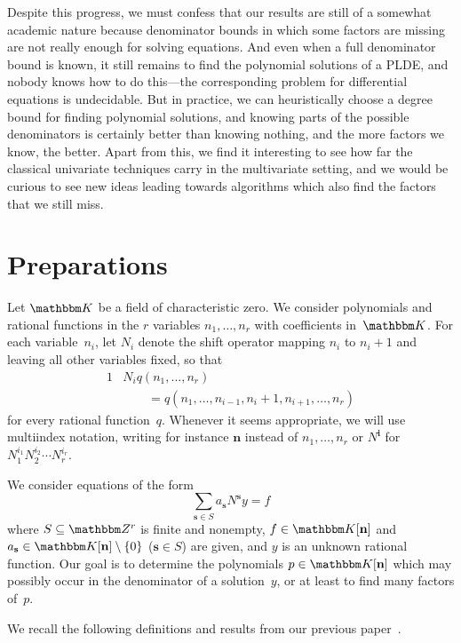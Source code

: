 \documentclass[a4paper]{sig-alternate}
\let\set\mathbbm
\def\vec#1{\mathbf{#1}}
\def\K{\set K}
\begin{document}
Despite this progress, we must confess that our results are still of a somewhat
academic nature because denominator bounds in which some factors are missing are
not really enough for solving equations. And even when a full denominator bound
is known, it still remains to find the polynomial solutions of a PLDE, and
nobody knows how to do this---the corresponding problem for differential
equations is undecidable. But in practice, we can heuristically choose a degree
bound for finding polynomial solutions, and knowing parts of the possible
denominators is certainly better than knowing nothing, and the more factors we
know, the better. Apart from this, we find it interesting to see how far the
classical univariate techniques carry in the multivariate setting, and we would
be curious to see new ideas leading towards algorithms which also find the
factors that we still miss.

\section{Preparations}

Let $\K$ be a field of characteristic zero. We consider polynomials and rational functions
in the $r$ variables $n_1,\dots,n_r$ with coefficients in~$\K$. For each variable~$n_i$,
let $N_i$ denote the shift operator mapping $n_i$ to $n_i+1$ and leaving all other variables
fixed, so that
\begin{alignat*}1
  &N_i q(n_1,\dots,n_r)\\
  &\qquad=q(n_1,\dots,n_{i-1},n_i+1,n_{i+1},\dots,n_r)
\end{alignat*}
for every rational function~$q$. Whenever it seems appropriate, we will use multiindex
notation, writing for instance $\vec n$ instead of $n_1,\dots,n_r$ or $N^{\vec i}$
for $N_1^{i_1}N_2^{i_2}\cdots N_r^{i_r}$.

We consider equations of the form
\begin{equation}\label{eq:main}
  \sum_{\vec s\in S}a_{\vec s}N^{\vec s}y=f
\end{equation}
where $S\subseteq\set Z^r$ is finite and nonempty, $f\in\K[\vec n]$ and $a_{\vec s}\in\K[\vec n]\setminus\{0\}$
($\vec s\in S$) are given, and $y$ is an unknown rational function.
Our goal is to determine the polynomials $p\in\K[\vec n]$ which may possibly occur in the denominator
of a solution~$y$, or at least to find many factors of~$p$.

We recall the following definitions and results from our previous paper~\cite{kauers10b}.
\end{document}
